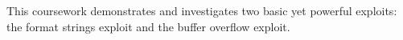 This coursework demonstrates and investigates two basic yet powerful exploits: the format strings exploit and the buffer overflow exploit.